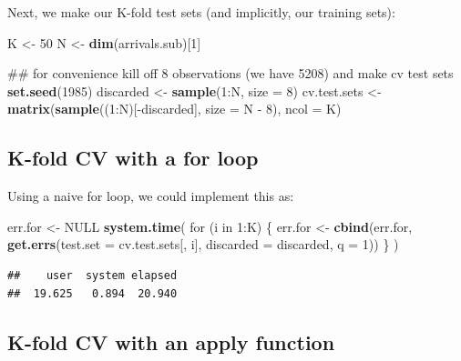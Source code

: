 \documentclass[]{article}
\newenvironment{Shaded}{\begin{snugshade}}{\end{snugshade}}
\newcommand{\KeywordTok}[1]{\textcolor[rgb]{0.13,0.29,0.53}{\textbf{{#1}}}}
\newcommand{\DataTypeTok}[1]{\textcolor[rgb]{0.13,0.29,0.53}{{#1}}}
\newcommand{\DecValTok}[1]{\textcolor[rgb]{0.00,0.00,0.81}{{#1}}}
\newcommand{\StringTok}[1]{\textcolor[rgb]{0.31,0.60,0.02}{{#1}}}
\newcommand{\OtherTok}[1]{\textcolor[rgb]{0.56,0.35,0.01}{{#1}}}
\newcommand{\NormalTok}[1]{{#1}}
\begin{document}
Next, we make our K-fold test sets (and implicitly, our training sets):

\begin{Shaded}
\begin{Highlighting}[]
\NormalTok{K <-}\StringTok{ }\DecValTok{50}
\NormalTok{N <-}\StringTok{ }\KeywordTok{dim}\NormalTok{(arrivals.sub)[}\DecValTok{1}\NormalTok{]}

\NormalTok{## for convenience kill off 8 observations (we have 5208) and make cv test sets}
\KeywordTok{set.seed}\NormalTok{(}\DecValTok{1985}\NormalTok{)}
\NormalTok{discarded <-}\StringTok{ }\KeywordTok{sample}\NormalTok{(}\DecValTok{1}\NormalTok{:N, }\DataTypeTok{size =} \DecValTok{8}\NormalTok{)}
\NormalTok{cv.test.sets <-}\StringTok{ }\KeywordTok{matrix}\NormalTok{(}\KeywordTok{sample}\NormalTok{((}\DecValTok{1}\NormalTok{:N)[-discarded], }\DataTypeTok{size =} \NormalTok{N -}\StringTok{ }\DecValTok{8}\NormalTok{), }\DataTypeTok{ncol =} \NormalTok{K)}
\end{Highlighting}
\end{Shaded}

\subsection{K-fold CV with a for loop}\label{k-fold-cv-with-a-for-loop}

Using a naive for loop, we could implement this as:

\begin{Shaded}
\begin{Highlighting}[]
\NormalTok{err.for <-}\StringTok{ }\OtherTok{NULL}
\KeywordTok{system.time}\NormalTok{(}
    \NormalTok{for (i in }\DecValTok{1}\NormalTok{:K) \{}
        \NormalTok{err.for <-}\StringTok{ }\KeywordTok{cbind}\NormalTok{(err.for, }\KeywordTok{get.errs}\NormalTok{(}\DataTypeTok{test.set =} \NormalTok{cv.test.sets[, i],}
                                           \DataTypeTok{discarded =} \NormalTok{discarded,}
                                           \DataTypeTok{q =} \DecValTok{1}\NormalTok{))}
        \NormalTok{\}}
    \NormalTok{)}
\end{Highlighting}
\end{Shaded}

\begin{verbatim}
##    user  system elapsed 
##  19.625   0.894  20.940
\end{verbatim}

\subsection{K-fold CV with an apply
function}\label{k-fold-cv-with-an-apply-function}
\end{document}
